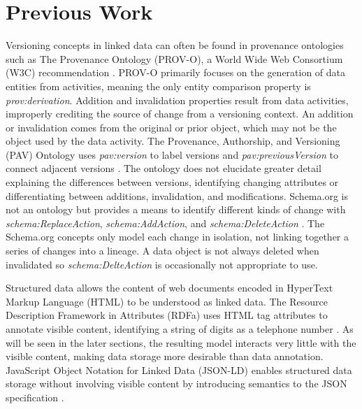 \section{Previous Work}

Versioning concepts in linked data can often be found in provenance ontologies such as The Provenance Ontology (PROV-O), a World Wide Web Consortium (W3C) recommendation \cite{Lebo2013}.
PROV-O primarily focuses on the generation of data entities from activities, meaning the only entity comparison property is \textit{prov:derivation}.
Addition and invalidation properties result from data activities, improperly crediting the source of change from a versioning context.
An addition or invalidation comes from the original or prior object, which may not be the object used by the data activity.
The Provenance, Authorship, and Versioning (PAV) Ontology uses \textit{pav:version} to label versions and \textit{pav:previousVersion} to connect adjacent versions \cite{Ciccarese2013}.
The ontology does not elucidate greater detail explaining the differences between versions, identifying changing attributes or differentiating between additions, invalidation, and modifications.
Schema.org is not an ontology but provides a means to identify different kinds of change with \textit{schema:ReplaceAction}, \textit{schema:AddAction}, and \textit{schema:DeleteAction} \cite{SchemaRep, SchemaAdd, SchemaRem}.
The Schema.org concepts only model each change in isolation, not linking together a series of changes into a lineage.
A data object is not always deleted when invalidated so \textit{schema:DelteAction} is occasionally not appropriate to use.

Structured data allows the content of web documents encoded in HyperText Markup Language (HTML) to be understood as linked data.
The Resource Description Framework in Attributes (RDFa) uses HTML tag attributes  to annotate visible content, identifying a string of digits as a telephone number \cite{Herman2015}.
As will be seen in the later sections, the resulting model interacts very little with the visible content, making data storage more desirable than data annotation.
JavaScript Object Notation for Linked Data (JSON-LD) enables structured data storage without involving visible content by introducing semantics to the JSON specification \cite{JSONLD}.


